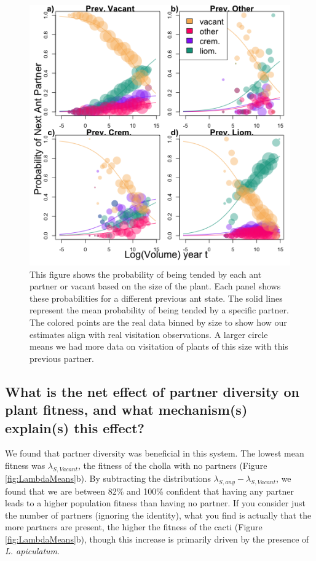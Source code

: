 \documentclass[11pt]{article}
\begin{document}
\begin{figure}[H]
	\includegraphics[width=0.95\linewidth]{Figures/AntSizeMulti.png}
	\caption{This figure shows the probability of being tended by each ant partner or vacant based on the size of the plant. Each panel shows these probabilities for a different previous ant state. The solid lines represent the mean probability of being tended by a specific partner. The colored points are the real data binned by size to show how our estimates align with real visitation observations. A larger circle means we had more data on visitation of plants of this size with this previous partner.}
	\label{fig:Ant_Transition}
\end{figure}

\subsection*{What is the net effect of partner diversity on plant fitness, and what mechanism(s) explain(s) this effect?}
We found that partner diversity was beneficial in this system. 
The lowest mean fitness was $\lambda_{S,Vacant}$, the fitness of the cholla with no partners (Figure \ref{fig:LambdaMeans}b).
By subtracting the distributions $\lambda_{S, any} - \lambda_{S,Vacant}$, we found that we are between 82\% and 100\% confident that having any partner leads to a higher population fitness than having no partner. 
If you consider just the number of partners (ignoring the identity), what you find is actually that the more partners are present, the higher the fitness of the cacti (Figure \ref{fig:LambdaMeans}b), though this increase is primarily driven by the presence of \textit{L. apiculatum}.
\end{document}
